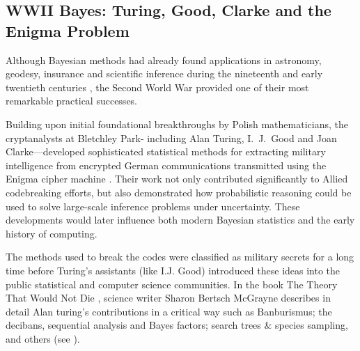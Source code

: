 



\subsection{WWII Bayes: Turing, Good, Clarke and the Enigma Problem}
\label{sec:wwii-turing-good-clarke}

Although Bayesian methods had already found applications in astronomy, geodesy, insurance and scientific inference during the nineteenth and early twentieth centuries   \cite{mcgrayne2011,hacking1975,franklin2001}, the Second World War provided one of their most remarkable practical successes. 

Building upon initial foundational breakthroughs by Polish mathematicians, the cryptanalysts at Bletchley Park- including Alan Turing, I.~J.~Good and Joan Clarke—developed sophisticated statistical methods for extracting military intelligence from encrypted German communications transmitted using the Enigma cipher machine \cite{hodges2014,hinsley1993}. Their work not only contributed significantly to Allied codebreaking efforts, but also demonstrated how probabilistic reasoning could be used to solve large-scale inference problems under uncertainty. These developments would later influence both modern Bayesian statistics and the early history of computing.

The methods used to break the codes were classified as military secrets for a long time before Turing's assistants (like I.J. Good) introduced these ideas into the public statistical and computer science communities. In the book The Theory That Would Not Die \cite{mcgrayne2011}, science writer Sharon Bertsch McGrayne describes in detail Alan turing's contributions in a critical way such as  Banburismus; the decibans, sequential analysis and Bayes factors; search trees \& species sampling, and others (see \cite{zabell2023secret}).

